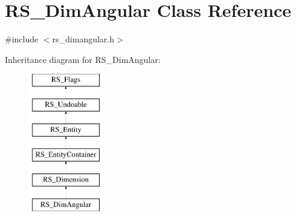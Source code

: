 \hypertarget{classRS__DimAngular}{\section{R\-S\-\_\-\-Dim\-Angular Class Reference}
\label{classRS__DimAngular}
}


{\ttfamily \#include $<$rs\-\_\-dimangular.\-h$>$}

Inheritance diagram for R\-S\-\_\-\-Dim\-Angular\-:\begin{figure}[H]
\begin{center}
\leavevmode
\includegraphics[height=6.000000cm]{classRS__DimAngular}
\end{center}
\end{figure}
